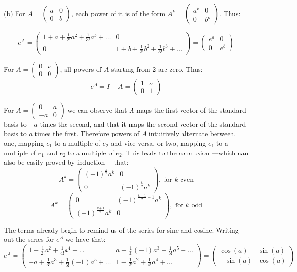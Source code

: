 \begin{solution}
    (b) For $A = \begin{pmatrix} a & 0 \\ 0 & b\end{pmatrix}$, each power of it is of the form $A^k = \begin{pmatrix} a^k & 0 \\ 0 & b^k \end{pmatrix}$. Thus:

    $$e^A = \begin{pmatrix} 1 + a + \frac{1}{2!}a^2 + \frac{1}{3!}a^3 + \ldots & 0 \\ 0 & 1 + b + \frac{1}{2!}b^2 + \frac{1}{3!}b^3 + \ldots \end{pmatrix} = \begin{pmatrix} e^a & 0 \\ 0 & e^b \end{pmatrix}$$

    For $A = \begin{pmatrix} 0 & a \\ 0 & 0\end{pmatrix}$, all powers of $A$ starting from 2 are zero. Thus:
    $$e^A = I + A = \begin{pmatrix}1 & a \\ 0 & 1\end{pmatrix}$$

    For $A = \begin{pmatrix} 0 & a \\ -a & 0 \end{pmatrix}$ we can observe that $A$ maps the first vector of the standard basis to $-a$ times the second, and that it maps the second vector of the standard basis to $a$ times the first. Therefore powers of $A$ intuitively alternate between, one, mapping $e_1$ to a multiple of $e_2$ and vice versa, or two, mapping $e_1$ to a multiple of $e_1$ and $e_2$ to a multiple of $e_2$. This leads to the conclusion ---which can also be easily proved by induction--- that:
    $$A^k = \begin{pmatrix}
        (-1)^{\frac{k}{2}}a^k & 0 \\ 0 & (-1)^{\frac{k}{2}}a^k
    \end{pmatrix}, \text{ for $k$ even}$$
    $$A^k = \begin{pmatrix}
        0 & (-1)^{\frac{k+1}{2} + 1}a^k \\ (-1)^{\frac{k+1}{2}}a^k & 0 
    \end{pmatrix}, \text{ for $k$ odd}$$
    
    The terms already begin to remind us of the series for sine and cosine. Writing  out the series for $e^A$ we have that:
    $$e^A = \begin{pmatrix}
        1 - \frac{1}{2!}a^2 + \frac{1}{4!}a^4 + \ldots & a + \frac{1}{3!}(-1)a^3 + \frac{1}{5!}a^5 + \ldots \\ -a + \frac{1}{3!}a^3 + \frac{1}{5!}(-1)a^5 + \ldots & 1 - \frac{1}{2!}a^2 + \frac{1}{4!}a^4 + \ldots 
    \end{pmatrix} = \begin{pmatrix}
        \cos(a) & \sin(a) \\ -\sin(a) & \cos(a)
    \end{pmatrix}$$


\end{solution}
